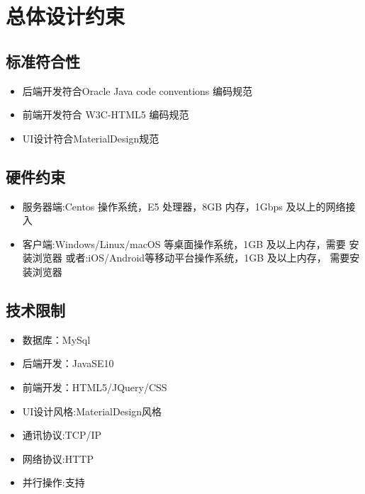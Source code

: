 \chapter{总体设计约束}
 
\section{标准符合性}
\begin{itemize}
  \item 后端开发符合Oracle Java code conventions 编码规范
  \item 前端开发符合 W3C-HTML5 编码规范
  \item UI设计符合MaterialDesign规范
\end{itemize}

\section{硬件约束}
\begin{itemize}
  \item 服务器端:Centos 操作系统，E5 处理器，8GB 内存，1Gbps 及以上的网络接入
  \item 客户端:Windows/Linux/macOS 等桌面操作系统，1GB 及以上内存，需要 安装浏览器 或者:iOS/Android等移动平台操作系统，1GB 及以上内存， 需要安装浏览器
\end{itemize}

\section{技术限制}
\begin{itemize}
  \item 数据库：MySql
  \item 后端开发：JavaSE10
  \item 前端开发：HTML5/JQuery/CSS
  \item UI设计风格:MaterialDesign风格
  \item 通讯协议:TCP/IP
  \item 网络协议:HTTP
  \item 并行操作:支持
\end{itemize}